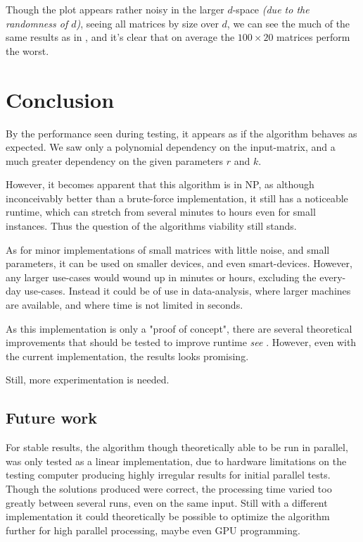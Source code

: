 \documentclass[a4paper]{article}
\begin{document}
Though the plot appears rather noisy in the larger $d$-space \textit{(due to the randomness of $d$)},
seeing all matrices by size over $d$, we can see the much of the same results as
in , and it's clear that on average the $100 \times 20$ matrices perform
the worst.

%
%

\section{Conclusion}
\label{sec:conclusion}
By the performance seen during testing, it appears as if the algorithm behaves as expected. We saw only a polynomial
dependency on the input-matrix, and a much greater dependency on the given parameters $r$ and $k$.

However, it becomes apparent that this algorithm is in NP, as although inconceivably better than a brute-force
implementation, it still has a noticeable runtime, which can stretch from several minutes to hours even for small instances. 
Thus the question of the algorithms viability still stands.

As for minor implementations of small matrices with little noise, and small parameters, it can be used on smaller devices,
and even smart-devices. However, any larger use-cases would wound up in minutes or hours, excluding the every-day use-cases.
Instead it could be of use in data-analysis, where larger machines are available, and where time is not limited in seconds.

As this implementation is only a "proof of concept", there are several theoretical improvements that should be tested to improve
runtime \textit{see }. However, even with the current implementation, the results looks promising.

Still, more experimentation is needed.

\subsection{Future work}
\label{sec:future-work}
For stable results, the algorithm though theoretically able to be run in parallel, was only tested as a linear implementation,
due to hardware limitations on the testing computer producing highly irregular results for initial parallel tests.
Though the solutions produced were correct, the processing time varied too greatly between several runs, even on the same input.
Still with a different implementation it could theoretically be possible to optimize the algorithm further
for high parallel processing, maybe even GPU programming.
\end{document}
